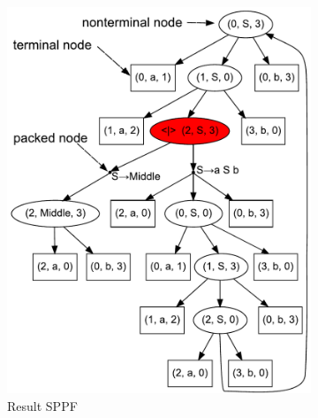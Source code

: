 \begin{figure}[ht]
    \begin{center}
    \centering
    \begin{subfigure}[b]{0.3\textwidth}
         \includegraphics[width=\textwidth]{dot/AnBn.pdf}
        \caption{Result SPPF}
        \label{SPPF}        
    \end{subfigure}
    ~
    \begin{subfigure}[b]{0.3\textwidth}

\end{subfigure}
\end{center}
\end{figure}
